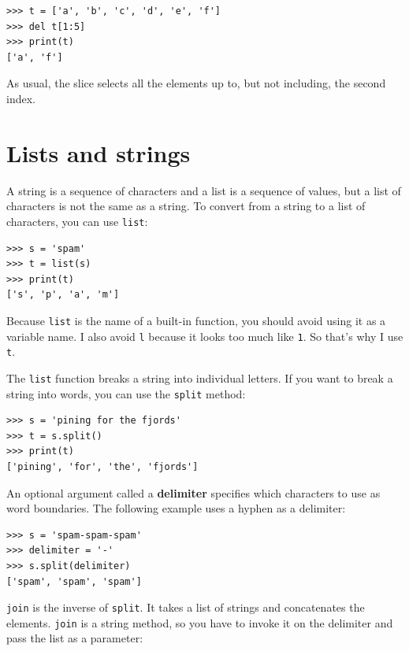 \documentclass[10pt]{book}
\begin{document}
\beforeverb
\begin{verbatim}
>>> t = ['a', 'b', 'c', 'd', 'e', 'f']
>>> del t[1:5]
>>> print(t)
['a', 'f']
\end{verbatim}
\afterverb
%
As usual, the slice selects all the elements up to, but not
including, the second index.


\section{Lists and strings}


A string is a sequence of characters and a list is a sequence
of values, but a list of characters is not the same as a
string.  To convert from a string to a list of characters,
you can use {\tt list}:


\beforeverb
\begin{verbatim}
>>> s = 'spam'
>>> t = list(s)
>>> print(t)
['s', 'p', 'a', 'm']
\end{verbatim}
\afterverb
%
Because {\tt list} is the name of a built-in function, you should
avoid using it as a variable name.  I also avoid {\tt l} because
it looks too much like {\tt 1}.  So that's why I use {\tt t}.

The {\tt list} function breaks a string into individual letters.  If
you want to break a string into words, you can use the {\tt split}
method:


\beforeverb
\begin{verbatim}
>>> s = 'pining for the fjords'
>>> t = s.split()
>>> print(t)
['pining', 'for', 'the', 'fjords']
\end{verbatim}
\afterverb
%
An optional argument called a {\bf delimiter} specifies which
characters to use as word boundaries.
The following example
uses a hyphen as a delimiter:


\beforeverb
\begin{verbatim}
>>> s = 'spam-spam-spam'
>>> delimiter = '-'
>>> s.split(delimiter)
['spam', 'spam', 'spam']
\end{verbatim}
\afterverb
%
{\tt join} is the inverse of {\tt split}.  It
takes a list of strings and
concatenates the elements.  {\tt join} is a string method,
so you have to invoke it on the delimiter and pass the
list as a parameter:
\end{document}
